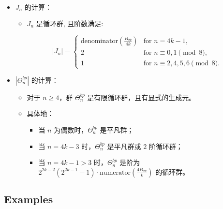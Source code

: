 \documentclass[
]{ctexart}
\providecommand{\tightlist}{%
  \setlength{\itemsep}{0pt}\setlength{\parskip}{0pt}}
\begin{document}
\begin{itemize}
\tightlist
\item
  \(J_n\) 的计算：

  \begin{itemize}
  \item
    \(J_n\) 是循环群, 且阶数满足:

    \[|J_n| =
      \begin{cases}
      \text{denominator}\left( \frac{B_{2k}}{4k} \right) & \text{for } n = 4k - 1, \\
      2 & \text{for } n \equiv 0,1 \pmod{8}, \\
      1 & \text{for } n \equiv 2,4,5,6 \pmod{8}.
      \end{cases}\]
  \end{itemize}
\item
  \(|\Theta_n^{bp}|\) 的计算：

  \begin{itemize}
  \tightlist
  \item
    对于 \(n \geq 4\)，群 \(\Theta^{bp}_n\)
    是有限循环群，且有显式的生成元。
  \item
    具体地：

    \begin{itemize}
    \tightlist
    \item
      当 \(n\) 为偶数时，\(\Theta^{bp}_n\) 是平凡群；
    \item
      当 \(n = 4k - 3\) 时，\(\Theta^{bp}_n\) 是平凡群或 \(2\)
      阶循环群；
    \item
      当 \(n = 4k - 1 > 3\) 时，\(\Theta^{bp}_n\) 是阶为
      \(2^{2k-2}(2^{2k-1} - 1) \cdot \text{numerator}\left(\frac{4B_{2k}}{k}\right)\)
      的循环群。
    \end{itemize}
  \end{itemize}
\end{itemize}

\subsection{Examples}\label{examples}
\end{document}
